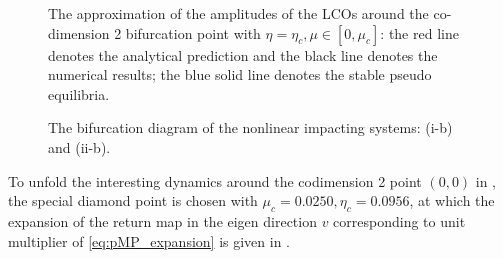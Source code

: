 \begin{figure}[h!]
	\centering
	\caption{The approximation of the amplitudes of the LCOs around the co-dimension 2 bifurcation point with
		$\eta = \eta_c,\mu \in [0, \mu_c]$: the red line denotes the analytical prediction and the black line
		denotes
		the numerical results; the blue solid line denotes the stable pseudo equilibria.}
	\label{fig:sn_amplitude_approximation}
\end{figure}
%
\begin{figure}[h!]
	\centering
	\caption{The bifurcation diagram of the nonlinear impacting systems: (i-b) and (ii-b).}
	\label{fig:nl_sn_pd_BEB_diagram}
\end{figure}
%
To unfold the interesting dynamics around the codimension 2 point $(0,0)$ in , the
special diamond point is chosen with $\mu_c = 0.0250, \eta_c = 0.0956$, at which the expansion of the return map
in the eigen direction $v$ corresponding to unit multiplier of \cref{eq:pMP_expansion} is given in
.
%
